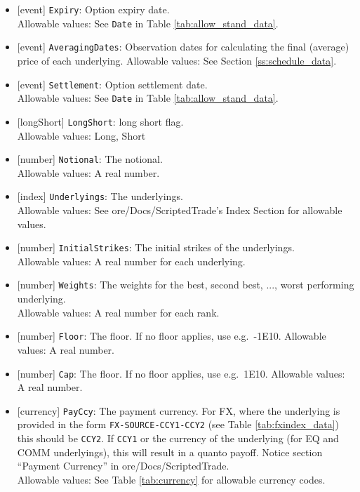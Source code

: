 \begin{itemize}
    \item{}[event] \lstinline!Expiry!: Option expiry date. \\
      Allowable values: See \lstinline!Date! in Table \ref{tab:allow_stand_data}.
    \item{}[event] \lstinline!AveragingDates!: Observation dates for calculating the final
      (average) price of each underlying.
      Allowable values: See Section \ref{ss:schedule_data}.
    \item{}[event] \lstinline!Settlement!: Option settlement date. \\
      Allowable values: See \lstinline!Date! in Table \ref{tab:allow_stand_data}.
    \item{}[longShort] \lstinline!LongShort!: long short flag. \\
      Allowable values: Long, Short
    \item{}[number] \lstinline!Notional!: The notional. \\
      Allowable values: A real number.
    \item{}[index] \lstinline!Underlyings!: The underlyings. \\
      Allowable values: See ore/Docs/ScriptedTrade's Index Section for allowable values.
    \item{}[number] \lstinline!InitialStrikes!: The initial strikes of the underlyings.\\
      Allowable values: A real number for each underlying.
    \item{}[number] \lstinline!Weights!: The weights for the best, second best, ..., worst performing underlying.\\
      Allowable values: A real number for each rank.
    \item{}[number] \lstinline!Floor!: The floor. If no floor applies, use e.g.\ -1E10.
      Allowable values: A real number.
    \item{}[number] \lstinline!Cap!: The floor. If no floor applies, use e.g.\ 1E10.
      Allowable values: A real number.
    \item{}[currency] \lstinline!PayCcy!: The payment currency. For FX, where the underlying is provided
    in the form \lstinline!FX-SOURCE-CCY1-CCY2! (see Table \ref{tab:fxindex_data}) this should
    be \lstinline!CCY2!. If \lstinline!CCY1! or the currency of the underlying (for EQ and
    COMM underlyings), this will result in a quanto payoff. Notice section ``Payment Currency'' in ore/Docs/ScriptedTrade. \\
      Allowable values: See Table \ref{tab:currency} for allowable currency codes.
 \end{itemize}

